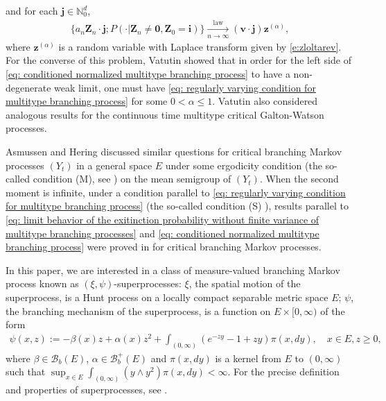\documentclass[12pt,a4paper]{amsart}
\theoremstyle{definition}
\numberwithin{equation}{section}
\begin{document}
and for each $\mathbf j \in \mathbb N_0^d$,
\begin{align}\label{eq: conditioned normalized multitype branching process}
	\{ a_n \mathbf Z_n \cdot \mathbf j ; P(\cdot | \mathbf Z_n \neq \mathbf 0, \mathbf Z_0 = \mathbf i)\}
	\xrightarrow[n\to \infty]{\operatorname{law}} (\mathbf v\cdot \mathbf j) \mathbf z^{(\alpha)},
\end{align}
where $\mathbf z^{(\alpha)}$ is a random variable with Laplace transform given by \eqref{e:zloltarev}.
For the converse of this problem, Vatutin \cite{Vatutin1977Limit} showed that in order for the left side of \eqref{eq: conditioned normalized multitype branching process} to have a non-degenerate weak limit, one must have \eqref{eq: regularly varying condition for multitype branching process} for some $0 < \alpha \leq 1$.
Vatutin \cite{Vatutin1977Limit} also considered analogous results for the continuous time multitype critical Galton-Watson processes.
	
Asmussen and Hering \cite[Sections~6.3~and~6.4]{AsmussenHering1983Branching} discussed similar questions for critical branching Markov processes $(Y_t)$ in a general space $E$ under some ergodicity condition (the so-called condition (M), see \cite[p.~156]{AsmussenHering1983Branching}) on the mean semigroup of $(Y_t)$.
When the second moment is infinite, under a condition  parallel  to \eqref{eq: regularly varying condition for multitype branching process} (the so-called condition (S) \cite[p.~207]{AsmussenHering1983Branching}), results parallel to \eqref{eq: limit behavior of the exitinction probability without finite variance of multitype branching processes} and \eqref{eq: conditioned normalized multitype branching process} were proved in \cite[Theorem~6.4.2]{AsmussenHering1983Branching} for critical branching Markov processes.

In this paper, we are interested in a class of measure-valued branching Markov process known as $(\xi, \psi)$-superprocesses:
$\xi$, the spatial motion of the superprocess, is a Hunt process on a locally compact separable metric space $E$;
$\psi$, the branching mechanism of the superprocess, is a function on $E \times [0,\infty)$ of the form
\begin{align} \label{eq: branching mechanism}
	\psi(x,z):=
	- \beta(x) z + \alpha (x) z^2 + \int_{(0,\infty)} (e^{-zy} - 1 + zy) \pi(x,dy),
	\quad x\in E, z\geq 0,
\end{align}
where $\beta \in \mathscr B_b(E)$, $\alpha \in \mathscr B^+_b(E)$ and $\pi(x,dy)$ is a kernel from $E$ to $(0,\infty)$ such that $\sup_{x\in E} \int_{(0,\infty)} (y\wedge y^2) \pi(x,dy) < \infty$.
For the precise definition and properties of superprocesses, see \cite{Li2011Measure-valued}.
\end{document}
